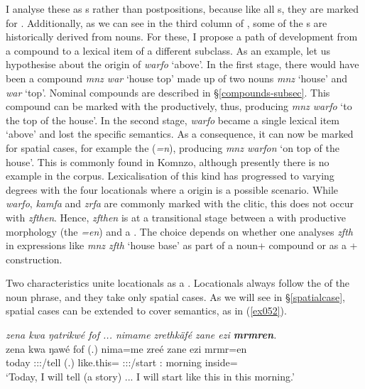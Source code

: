I analyse these as  s rather than postpositions, because like all s, they are marked for . Additionally, as we can see in the third column of , some of the  s are historically derived from nouns. For these, I propose a path of development from a  compound to a lexical item of a different  subclass. As an example, let us hypothesise about the origin of \emph{warfo} `above'. In the first stage, there would have been a  compound \emph{mnz war} `house top' made up of two nouns \emph{mnz} `house' and \emph{war} `top'. Nominal compounds are described in {\S}\ref{compounds-subsec}. This compound can be marked with the   productively, thus, producing \emph{mnz warfo} `to the top of the house'. In the second stage, \emph{warfo} became a single lexical item `above' and lost the specific  semantics. As a consequence, it can now be marked for spatial cases, for example the   (\emph{=n}), producing \emph{mnz warfon} `on top of the house'. This is commonly found in Komnzo, although presently there is no example in the corpus. Lexicalisation of this kind has progressed to varying degrees with the four locationals where a  origin is a possible scenario. While \emph{warfo}, \emph{kamfa} and \emph{zrfa} are commonly marked with the   clitic, this does not occur with \emph{zfthen}. Hence, \emph{zfthen} is at a transitional stage between a  with productive morphology (the   \emph{=en}) and a . The choice depends on whether one analyses \emph{zfth} in expressions like \emph{mnz zfth} `house base' as part of a noun+ compound or as a + construction.

Two characteristics unite locationals as a . Locationals always follow the  of the noun phrase, and they take only spatial cases. As we will see in {\S}\ref{spatialcase}, spatial cases can be extended to cover  semantics, as in (\ref{ex052}).

\begin{exe}
	\ex \emph{zena kwa ŋatrikwé fof ... nimame zrethkäfé zane ezi \textbf{mrmren}.}\\
	\gll zena kwa ŋawé fof (.) nima=me zreé zane ezi mrmr=en\\
	today {\Fut} \Fsg:\Sbj:\Nonpast:\Ipfv/tell {\Emph} (.) {like.this}={\Ins} \Fsg:\Sbj:\Irr:\Pfv/start \Dem:{\Prox} morning inside={\Loc}\\
	\trans `Today, I will tell (a story) ... I will start like this in this morning.'\\ 
	\label{ex052}
\end{exe}

